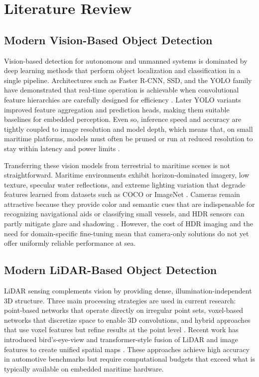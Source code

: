 \documentclass[../main.tex]{subfiles}
\begin{document}
\section{Literature Review}

\subsection{Modern Vision-Based Object Detection}
Vision-based detection for autonomous and unmanned systems is dominated by deep learning methods that perform object localization and classification in a single pipeline. Architectures such as Faster R-CNN, SSD, and the YOLO family have demonstrated that real-time operation is achievable when convolutional feature hierarchies are carefully designed for efficiency \cite{he2016, ren2016, ultralytics}. Later YOLO variants improved feature aggregation and prediction heads, making them suitable baselines for embedded perception. Even so, inference speed and accuracy are tightly coupled to image resolution and model depth, which means that, on small maritime platforms, models must often be pruned or run at reduced resolution to stay within latency and power limits \cite{tan2020}.

Transferring these vision models from terrestrial to maritime scenes is not straightforward. Maritime environments exhibit horizon-dominated imagery, low texture, specular water reflections, and extreme lighting variation that degrade features learned from datasets such as COCO or ImageNet \cite{bovcon2020, prasad2017}. Cameras remain attractive because they provide color and semantic cues that are indispensable for recognizing navigational aids or classifying small vessels, and HDR sensors can partly mitigate glare and shadowing \cite{thompson2023}. However, the cost of HDR imaging and the need for domain-specific fine-tuning mean that camera-only solutions do not yet offer uniformly reliable performance at sea.

\subsection{Modern LiDAR-Based Object Detection}
LiDAR sensing complements vision by providing dense, illumination-independent 3D structure. Three main processing strategies are used in current research: point-based networks that operate directly on irregular point sets, voxel-based networks that discretize space to enable 3D convolutions, and hybrid approaches that use voxel features but refine results at the point level \cite{garcia-garcia2016, zhou2018a, shi2021}. Recent work has introduced bird's-eye-view and transformer-style fusion of LiDAR and image features to create unified spatial maps \cite{liu2023bevfusion, bai2022transfusion, zhao2021}. These approaches achieve high accuracy in automotive benchmarks but require computational budgets that exceed what is typically available on embedded maritime hardware.
\end{document}
